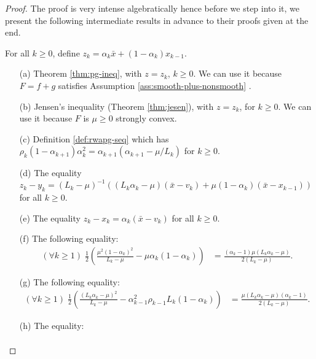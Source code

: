 \documentclass[12pt]{article}
\begin{document}
        \begin{proof}
            The proof is very intense algebratically hence before we step into it, we present the following intermediate results in advance to their proofs given at the end. 
            \par
            For all $k \ge 0$, define $z_k = \alpha_k \bar x + (1 - \alpha_k)x_{k - 1}$. 
            \begin{itemize}
                \item [(a)] Theorem \ref{thm:pg-ineq}, with $z = z_k$, $k \ge 0$. We can use it because $F = f + g$ satisfies Assumption \ref{ass:smooth-plus-nonsmooth} . 
                \item [(b)] Jensen's inequality (Theorem \ref{thm:jesen}), with $z = z_k$, for $k \ge 0$. We can use it because $F$ is $\mu \ge 0$ strongly convex. 
                \item [(c)] Definition \ref{def:rwapg-seq} which has $\rho_k(1 - \alpha_{k + 1})\alpha_k^2 = \alpha_{k + 1}(\alpha_{k + 1} - \mu/L_k)$ for $k \ge 0$.
                \item [(d)] The equality $z_k - y_k = (L_k - \mu)^{-1}((L_k\alpha_k - \mu)(\bar x - v_k) + \mu(1 - \alpha_k)(\bar x - x_{k - 1}))$ for all $k \ge 0$. 
                \item [(e)] The equality $z_k - x_k = \alpha_k(\bar x - v_k)$ for all $k \ge 0$. 
                \item [(f)] The following equality: 
                \begin{align*}
                    (\forall k \ge 1)\; \frac{1}{2}\left(
                        \frac{\mu^2(1 - \alpha_k)^2}{L_k - \mu} - \mu \alpha_k(1 - \alpha_k)
                    \right) &= 
                    \frac{(\alpha_k - 1)\mu(L_k\alpha_k - \mu)}{2(L_k - \mu)}. 
                \end{align*}
                \item [(g)] The following equality: 
                \begin{align*}
                    (\forall k \ge 1)\; 
                    \frac{1}{2}\left(
                        \frac{(L_k\alpha_k - \mu)^2}{L_k - \mu} - 
                        \alpha_{k - 1}^2\rho_{k - 1}L_k(1 - \alpha_k)
                    \right)
                    &= 
                    \frac{\mu(L_k\alpha_k - \mu)(\alpha_k - 1)}{2(L_k - \mu)}. 
                \end{align*}
                \item [(h)] The equality: 
                \begin{align*}

\end{align*}
\end{itemize}
\end{proof}
\end{document}
